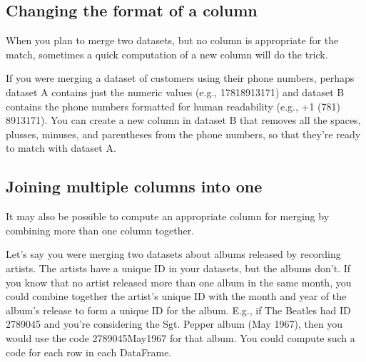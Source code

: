 \documentclass[letterpaper,10pt,english]{jupyterBook}
\begin{document}
\begin{sphinxVerbatim}[commandchars=\\\{\}]
    
    \PYG{p}{[}\PYG{p}{]}
    \PYG{p}{[}\PYG{p}{]} 
\end{sphinxVerbatim}


\subsection{Changing the format of a column}
\label{\detokenize{chapter-12-concat-and-merge:changing-the-format-of-a-column}}
\sphinxAtStartPar
When you plan to merge two datasets, but no column is appropriate for the match, sometimes a quick computation of a new column will do the trick.

\sphinxAtStartPar
{}  If you were merging a dataset of customers using their phone numbers, perhaps dataset A contains just the numeric values (e.g., 17818913171) and dataset B contains the phone numbers formatted for human readability (e.g., +1 (781) 891\sphinxhyphen{}3171).  You can create a new column in dataset B that removes all the spaces, plusses, minuses, and parentheses from the phone numbers, so that they’re ready to match with dataset A.


\subsection{Joining multiple columns into one}
\label{\detokenize{chapter-12-concat-and-merge:joining-multiple-columns-into-one}}
\sphinxAtStartPar
It may also be possible to compute an appropriate column for merging by combining more than one column together.

\sphinxAtStartPar
{}  Let’s say you were merging two datasets about albums released by recording artists.  The artists have a unique ID in your datasets, but the albums don’t.  If you know that no artist released more than one album in the same month, you could combine together the artist’s unique ID with the month and year of the album’s release to form a unique ID for the album.  E.g., if The Beatles had ID 2789045 and you’re considering the Sgt. Pepper album (May 1967), then you would use the code 2789045\sphinxhyphen{}May\sphinxhyphen{}1967 for that album.  You could compute such a code for each row in each DataFrame.
\end{document}
